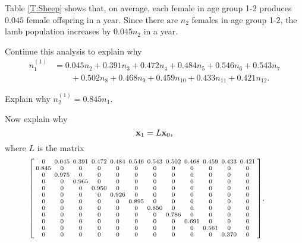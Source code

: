 \begin{pactivity} \label{Leslie_1} Table \ref{T:Sheep} shows that, on average, each female in age group 1-2 produces $0.045$ female offspring in a year. Since there are $n_2$ females in age group 1-2, the lamb population increases by $0.045n_2$ in a year. 
	\ba
	\item Continue this analysis to explain why 
	\begin{align*}
	n_1^{(1)} &= 0.045n_2+0.391 n_3+0.472n_4+0.484 n_5+0.546n_6+0.543n_7 \\
		&\qquad+0.502 n_8+0.468 n_9+0.459n_{10}+0.433 n_{11}+0.421 n_{12}.
	\end{align*}
	
	\item Explain why $n_2^{(1)} = 0.845n_1$. 
	
	\item Now explain why 
\begin{equation}
\mathbf{x}_1 = L\mathbf{x}_0, \label{eq:Leslie_1}
\end{equation}
where $L$ is the matrix 
 \begin{equation} \label{eq:Leslie_2}
 {\scriptsize \hspace*{-0.25in} \left[\arraycolsep=2.0pt  \begin{array}{cccccccccccc} 
0     	& 0.045 & 0.391 & 0.472 & 0.484 & 0.546 & 0.543 & 0.502 & 0.468 & 0.459 & 0.433 & 0.421 \\
0.845 	& 0 	& 0 	& 0 	& 0 	& 0 	& 0 	& 0 	& 0 	& 0 	& 0 	& 0 \\
0 		& 0.975 & 0		& 0 	& 0 	& 0 	& 0 	& 0 	& 0 	& 0 	& 0 	& 0 \\
0 		& 0 	& 0.965	& 0 	& 0 	& 0 	& 0 	& 0 	& 0 	& 0 	& 0 	& 0 \\
0 		& 0 	& 0		& 0.950	& 0 	& 0 	& 0 	& 0 	& 0 	& 0 	& 0 	& 0 \\
0 		& 0 	& 0		& 0		& 0.926 & 0 	& 0 	& 0 	& 0 	& 0 	& 0 	& 0 \\
0 		& 0 	& 0		& 0		& 0 	& 0.895	& 0 	& 0 	& 0 	& 0 	& 0 	& 0 \\
0 		& 0 	& 0		& 0		& 0 	& 0		& 0.850	& 0 	& 0 	& 0 	& 0 	& 0 \\
0 		& 0 	& 0		& 0		& 0 	& 0		& 0		& 0.786	& 0 	& 0 	& 0 	& 0 \\
0 		& 0 	& 0		& 0		& 0 	& 0		& 0		& 0		& 0.691	& 0 	& 0 	& 0 \\
0 		& 0 	& 0		& 0		& 0 	& 0		& 0		& 0		& 0		& 0.561	& 0 	& 0 \\
0 		& 0 	& 0		& 0		& 0 	& 0		& 0		& 0		& 0		& 0		& 0.370	& 0 \\
\end{array} \right]}.
\end{equation}

	\ea
\end{pactivity}

